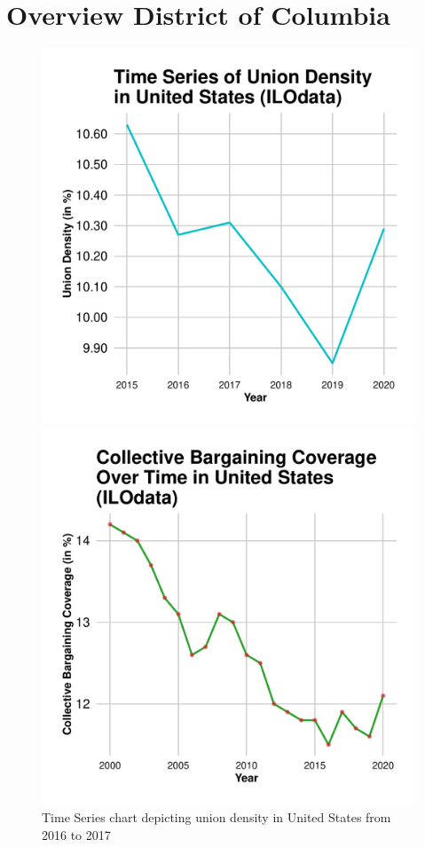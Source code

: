 \documentclass[11pt]{article}\usepackage[]{graphicx}\usepackage[]{xcolor}
\newenvironment{knitrout}{}{} %
\begin{document}
\section{Overview District of Columbia}
\begin{figure}[h!]
  \centering

  \begin{minipage}{0.48\linewidth}
\begin{knitrout}
\color{fgcolor}

{\centering \includegraphics[width=0.7\linewidth]{figure/United_Statestradeuniondensity-1} 

}


\end{knitrout}
    \caption{Time Series chart depicting union density in United States from 2016 to 2017}
  \end{minipage}
  \hfill
  \begin{minipage}{0.48\linewidth}
\begin{knitrout}
\color{fgcolor}

{\centering \includegraphics[width=0.7\linewidth]{figure/United_StatesCollectiveBargaining-1} 

}
\end{knitrout}
\end{minipage}
\end{figure}
\end{document}
